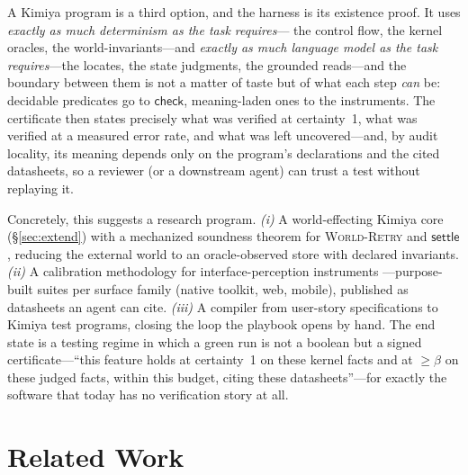 \documentclass[acmsmall,screen,nonacm]{acmart}
\newcommand{\checkk}{\mathsf{check}}
\newcommand{\settle}{\mathsf{settle}}
\theoremstyle{acmdefinition}%
\theoremstyle{acmplain}%
\begin{document}
A Kimiya program is a third option, and the harness is its existence
proof. It uses \emph{exactly as much determinism as the task requires}---
the control flow, the kernel oracles, the world-invariants---and
\emph{exactly as much language model as the task requires}---the
locates, the state judgments, the grounded reads---and the boundary
between them is not a matter of taste but of what each step \emph{can} be:
decidable predicates go to $\checkk$, meaning-laden ones to the
instruments. The certificate then states precisely what was verified at
certainty~1, what was verified at a measured error rate, and what was left
uncovered---and, by audit locality, its meaning depends only on the
program's declarations and the cited datasheets, so a reviewer (or a
downstream agent) can trust a test without replaying it.

Concretely, this suggests a research program. \emph{(i)} A
world-effecting Kimiya core (\S\ref{sec:extend}) with a mechanized
soundness theorem for \textsc{World-Retry} and $\settle$, reducing the
external world to an oracle-observed store with declared invariants.
\emph{(ii)} A calibration methodology for interface-perception instruments
---purpose-built suites per surface family (native toolkit, web, mobile),
published as datasheets an agent can cite. \emph{(iii)} A compiler from
user-story specifications to Kimiya test programs, closing the loop the
playbook opens by hand. The end state is a testing regime in which a
green run is not a boolean but a signed certificate---``this feature holds
at certainty~1 on these kernel facts and at $\ge\beta$ on these judged
facts, within this budget, citing these datasheets''---for exactly the
software that today has no verification story at all.

\section{Related Work}
\label{sec:related}
\end{document}
